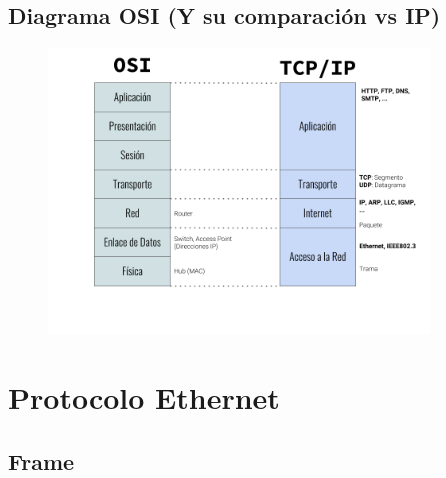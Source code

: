 \documentclass[12pt, fleqn]{report}                             %
\theoremstyle{break}                                            %
\begin{document}
        \section{Diagrama OSI (Y su comparación vs IP)}

            \begin{figure}[h]
                \centering
                \includegraphics[width=0.9\textwidth]{OSI&IP}
            \end{figure}





    \clearpage
    \chapter{Protocolo Ethernet}



        \clearpage
        \section{Frame}
\end{document}
